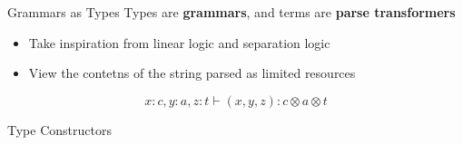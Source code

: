 \documentclass[10pt]{beamer}
\begin{document}
\begin{frame}{Grammars as Types}
  Types are \textbf{grammars}, and terms are \textbf{parse transformers}

  \begin{itemize}
    \item Take inspiration from linear logic and separation logic
    \item View the contetns of the string parsed as limited resources
  \end{itemize}

  \[
    x : c, y : a, z : t \vdash (x, y, z) : c \otimes a \otimes t
  \]
\end{frame}

\begin{frame}{Type Constructors}
\end{frame}
\end{document}
